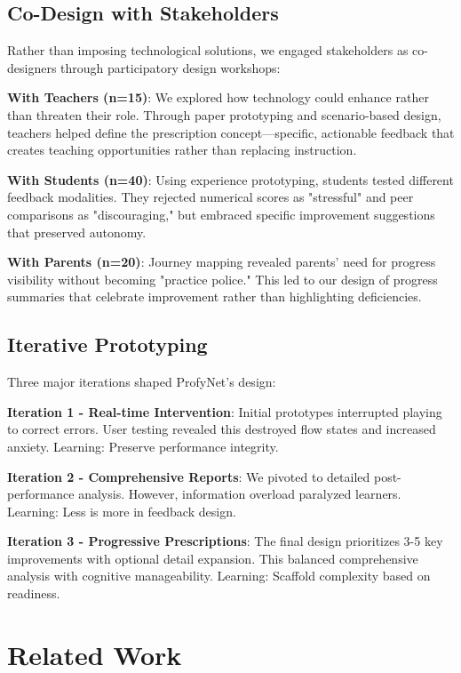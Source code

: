 \documentclass[sigconf,review,anonymous]{acmart}
\begin{document}
\subsection{Co-Design with Stakeholders}

Rather than imposing technological solutions, we engaged stakeholders as co-designers through participatory design workshops:

\textbf{With Teachers (n=15)}: We explored how technology could enhance rather than threaten their role. Through paper prototyping and scenario-based design, teachers helped define the prescription concept—specific, actionable feedback that creates teaching opportunities rather than replacing instruction.

\textbf{With Students (n=40)}: Using experience prototyping, students tested different feedback modalities. They rejected numerical scores as "stressful" and peer comparisons as "discouraging," but embraced specific improvement suggestions that preserved autonomy.

\textbf{With Parents (n=20)}: Journey mapping revealed parents' need for progress visibility without becoming "practice police." This led to our design of progress summaries that celebrate improvement rather than highlighting deficiencies.

\subsection{Iterative Prototyping}

Three major iterations shaped ProfyNet's design:

\textbf{Iteration 1 - Real-time Intervention}: Initial prototypes interrupted playing to correct errors. User testing revealed this destroyed flow states and increased anxiety. Learning: Preserve performance integrity.

\textbf{Iteration 2 - Comprehensive Reports}: We pivoted to detailed post-performance analysis. However, information overload paralyzed learners. Learning: Less is more in feedback design.

\textbf{Iteration 3 - Progressive Prescriptions}: The final design prioritizes 3-5 key improvements with optional detail expansion. This balanced comprehensive analysis with cognitive manageability. Learning: Scaffold complexity based on readiness.

\section{Related Work}
\end{document}
